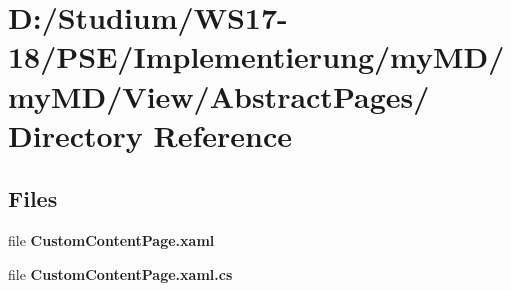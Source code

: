 \hypertarget{dir_D_3A_2FStudium_2FWS17_2D18_2FPSE_2FImplementierung_2FmyMD_2FmyMD_2FView_2FAbstractPages_2F}{
\section{D:/Studium/WS17-18/PSE/Implementierung/my\-MD/my\-MD/View/Abstract\-Pages/ Directory Reference}
\label{dir_D_3A_2FStudium_2FWS17_2D18_2FPSE_2FImplementierung_2FmyMD_2FmyMD_2FView_2FAbstractPages_2F}
}


\subsection*{Files}
\begin{CompactItemize}
\item 
file {\bf Custom\-Content\-Page.xaml}
\item 
file {\bf Custom\-Content\-Page.xaml.cs}
\end{CompactItemize}
